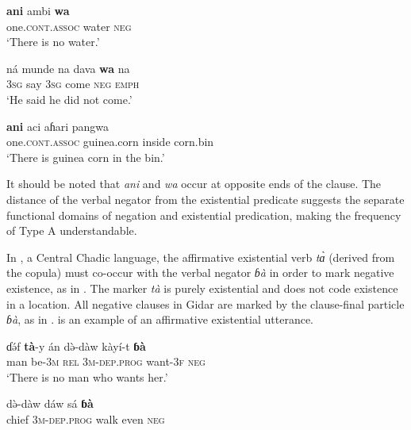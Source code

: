 \documentclass[output=paper,draft,draftmode,colorlinks,citecolor=brown]{langscibook}
\begin{document}
\ea\label{ex:paanci-water}

\gll \textbf{ani} ambi \textbf{wa}\\
one.\textsc{cont.assoc} water \textsc{neg}\\

\glt `There is no water.'{\footnotemark}
\ex\label{ex:paanci-come} 

\gll ná munde na dava \textbf{wa} na\\
3\textsc{sg} say 3\textsc{sg} come \textsc{neg} \textsc{emph}\\ 

\glt `He said he did not come.'
\ex\label{ex:paanci-corn}

\gll \textbf{ani} aci aɦari pangwa\\
one.\textsc{cont.assoc} guinea.corn inside corn.bin\\ 

\glt `There is guinea corn in the bin.'
\z
\z

It should be noted that \textit{ani} and \textit{wa} occur at opposite ends of the clause. The distance of the verbal negator from the existential predicate suggests the separate functional domains of negation and existential predication, making the frequency of Type A understandable.

In , a Central Chadic language, the affirmative existential verb \textit{t\`ɑ} (derived from the copula) must co-occur with the verbal negator \textit{ɓà} in order to mark negative existence, as in . The marker \textit{tà} is purely existential and does not code existence in a location. All negative clauses in Gidar are marked by the clause-final particle \textit{ɓà}, as in .  is an example of an affirmative existential utterance.

\ea\label{ex:gidar-want-chief-desire}

\ea\label{ex:gidar-want}

\gll ɗ\'əf \textbf{tà}-y án d\`ə-dàw kàyí-t \textbf{ɓà}\\
man be-3\textsc{m} \textsc{rel} 3\textsc{m}-\textsc{dep.prog} want-3\textsc{f} \textsc{neg}\\

\glt `There is no man who wants her.'
\ex\label{ex:gidar-chief}

 d\`ə-dàw dáw sá \textbf{ɓà}\\
chief 3\textsc{m}-\textsc{dep.prog} walk even \textsc{neg}\\
\end{document}
